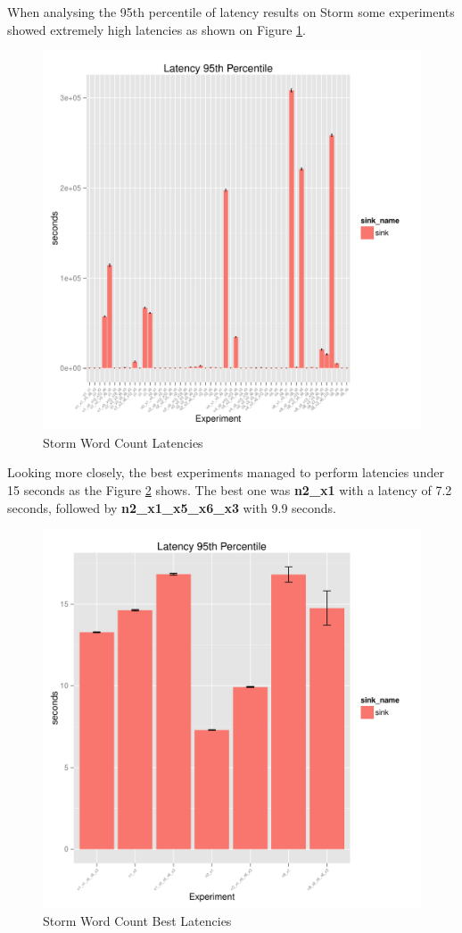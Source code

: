 \documentclass[ppgc,diss,english]{iiufrgs}
\begin{document}
When analysing the 95th percentile of latency results on Storm some experiments showed extremely high latencies as shown on Figure \ref{fig:storm_wordcount_latency}.

\begin{figure}[H]
    \centering
	\includegraphics[width=.6\textwidth]{summaries/storm_wordcount/full_latency.pdf}
	\caption{Storm Word Count Latencies}
	\label{fig:storm_wordcount_latency}
\end{figure}

Looking more closely, the best experiments managed to perform latencies under 15 seconds as the Figure \ref{fig:storm_wordcount_latency_best} shows. The best one was \textbf{n2\_x1} with a latency of 7.2 seconds, followed by \textbf{n2\_x1\_x5\_x6\_x3} with 9.9 seconds.

\begin{figure}[H]
    \centering
	\includegraphics[width=.6\textwidth]{summaries/storm_wordcount/full_best_latency.pdf}
	\caption{Storm Word Count Best Latencies}
	\label{fig:storm_wordcount_latency_best}
\end{figure}
\end{document}
